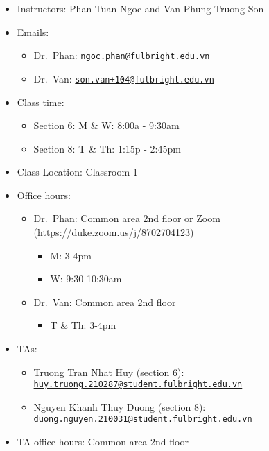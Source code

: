 \documentclass[
]{article}
\providecommand{\tightlist}{%
  \setlength{\itemsep}{0pt}\setlength{\parskip}{0pt}}
\begin{document}
\begin{itemize}
\tightlist
\item
  Instructors: Phan Tuan Ngoc and Van Phung Truong Son
\item
  Emails:

  \begin{itemize}
  \tightlist
  \item
    Dr.~Phan: \href{mailto:ngoc.phan@fulbright.edu.vn}{\nolinkurl{ngoc.phan@fulbright.edu.vn}}
  \item
    Dr.~Van: \href{mailto:son.van+104@fulbright.edu.vn}{\nolinkurl{son.van+104@fulbright.edu.vn}}
  \end{itemize}
\item
  Class time:

  \begin{itemize}
  \tightlist
  \item
    Section 6: M \& W: 8:00a - 9:30am
  \item
    Section 8: T \& Th: 1:15p - 2:45pm
  \end{itemize}
\item
  Class Location: Classroom 1
\item
  Office hours:

  \begin{itemize}
  \tightlist
  \item
    Dr.~Phan: Common area 2nd floor or Zoom (\url{https://duke.zoom.us/j/8702704123})

    \begin{itemize}
    \tightlist
    \item
      M: 3-4pm
    \item
      W: 9:30-10:30am
    \end{itemize}
  \item
    Dr.~Van: Common area 2nd floor

    \begin{itemize}
    \tightlist
    \item
      T \& Th: 3-4pm
    \end{itemize}
  \end{itemize}
\item
  TAs:

  \begin{itemize}
  \tightlist
  \item
    Truong Tran Nhat Huy (section 6): \href{mailto:huy.truong.210287@student.fulbright.edu.vn}{\nolinkurl{huy.truong.210287@student.fulbright.edu.vn}}
  \item
    Nguyen Khanh Thuy Duong (section 8): \href{mailto:duong.nguyen.210031@student.fulbright.edu.vn}{\nolinkurl{duong.nguyen.210031@student.fulbright.edu.vn}}
  \end{itemize}
\item
  TA office hours: Common area 2nd floor


\end{itemize}
\end{document}
